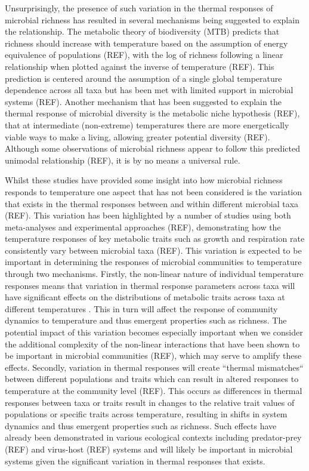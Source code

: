 \documentclass{article}
\begin{document}
Unsurprisingly, the presence of such variation in the thermal responses of microbial richness has resulted in several mechanisms being suggested to explain the relationship. The metabolic theory of biodiversity (MTB) predicts that richness should increase with temperature based on the assumption of energy equivalence of populations (REF), with the log of richness following a linear relationship when plotted against the inverse of temperature (REF). This prediction is centered around the assumption of a single global temperature dependence across all taxa but has been met with limited support in microbial systems (REF). Another mechanism that has been suggested to explain the thermal response of microbial diversity is the metabolic niche hypothesis (REF), that at intermediate (non-extreme) temperatures there are more energetically viable ways to make a living, allowing greater potential diversity (REF). Although some observations of microbial richness appear to follow this predicted unimodal relationship (REF), it is by no means a universal rule. 

Whilst these studies have provided some insight into how microbial richness responds to temperature one aspect that has not been considered is the variation that exists in the thermal responses between and within different microbial taxa (REF). This variation has been highlighted by a number of studies using both meta-analyses and experimental approaches (REF), demonstrating how the temperature responses of key metabolic traits such as growth and respiration rate consistently vary between microbial taxa (REF). This variation is expected to be important in determining the responses of microbial communities to temperature through two mechanisms. Firstly, the non-linear nature of individual temperature responses means that variation in thermal response parameters across taxa will have significant effects on the distributions of metabolic traits across taxa at different temperatures \citep{Savage2004}. This in turn will affect the response of community dynamics to temperature and thus emergent properties such as richness. The potential impact of this variation becomes especially important when we consider the additional complexity of the non-linear interactions that have been shown to be important in microbial communities (REF), which may serve to amplify these effects. Secondly, variation in thermal responses will create ``thermal mismatches`` between different populations and traits which can result in altered responses to temperature at the community level (REF). This occurs as differences in thermal responses between taxa or traits result in changes to the relative trait values of populations or specific traits across temperature, resulting in shifts in system dynamics and thus emergent properties such as richness. Such effects have already been demonstrated in various ecological contexts including predator-prey (REF) and virus-host (REF) systems and will likely be important in microbial systems given the significant variation in thermal responses that  exists. 
\end{document}
